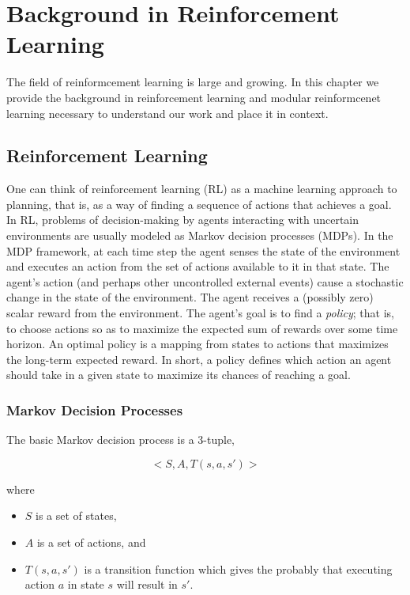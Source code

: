 \chapter{Background in Reinforcement Learning}\label{ch:rl}

The field of reinformcement learning is large and growing. In this chapter we provide the background in reinforcement learning and modular reinformcenet learning necessary to understand our work and place it in context.

\section{Reinforcement Learning}

One can think of reinforcement learning (RL) \cite{sutton1998reinforcement,kaelbling1996reinforcement} as a machine learning approach to planning, that is, as a way of finding a sequence of actions that achieves a goal. In RL, problems of decision-making by agents interacting with uncertain environments are usually modeled as Markov decision processes (MDPs). In the MDP framework, at each time step the agent senses the state of the environment and executes an action from the set of actions available to it in that state. The agent's action (and perhaps other uncontrolled external events) cause a stochastic change in the state of the environment. The agent receives a (possibly zero) scalar reward from the environment. The agent's goal is to find a {\it policy}; that is, to choose actions so as to maximize the expected sum of rewards over some time horizon. An optimal policy is a mapping from states to actions that maximizes the long-term expected reward.  In short, a policy defines which action an agent should take in a given state to maximize its chances of reaching a goal.

\subsection{Markov Decision Processes}

The basic Markov decision process is a 3-tuple,

\begin{equation}
<S, A, T(s, a, s')>
\end{equation}

where

\begin{itemize}
\item $S$ is a set of states,
\item $A$ is a set of actions, and
\item $T(s, a, s')$ is a transition function which gives the probably that executing action $a$ in state $s$ will result in $s'$.
\end{itemize}

